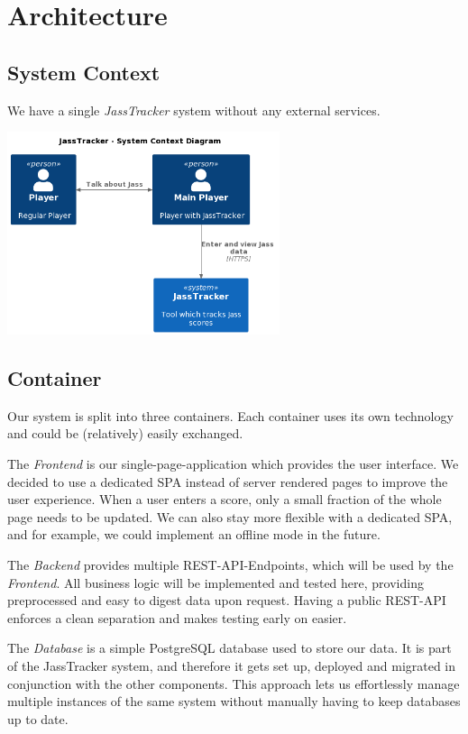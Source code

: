 \chapter{Architecture}

\section{System Context}
We have a single \emph{JassTracker} system without any external services.

\includegraphics[width=0.6\textwidth]{resources/diagrams/c4-1-system-context}

\section{Container}
Our system is split into three containers.
Each container uses its own technology and could be (relatively) easily exchanged.

The \emph{Frontend} is our single-page-application which provides the user interface.
We decided to use a dedicated SPA instead of server rendered pages to improve the user experience.
When a user enters a score, only a small fraction of the whole page needs to be updated.
We can also stay more flexible with a dedicated SPA, and for example, we could implement an offline mode in the future.

The \emph{Backend} provides multiple REST-API-Endpoints, which will be used by the \emph{Frontend}.
All business logic will be implemented and tested here, providing preprocessed and easy to digest data upon request.
Having a public REST-API enforces a clean separation and makes testing early on easier.

The \emph{Database} is a simple PostgreSQL database used to store our data.
It is part of the JassTracker system, and therefore it gets set up, deployed and migrated in conjunction with the other components.
This approach lets us effortlessly manage multiple instances of the same system without manually having to keep databases up to date.

